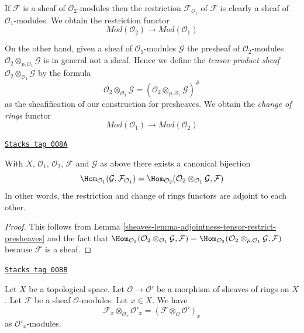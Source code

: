 \medskip\noindent
If $\mathcal{F}$ is a sheaf of $\mathcal{O}_2$-modules
then the restriction $\mathcal{F}_{\mathcal{O}_1}$
of $\mathcal{F}$ is clearly a sheaf
of $\mathcal{O}_1$-modules. We obtain the restriction functor
$$
\textit{Mod}(\mathcal{O}_2)
\longrightarrow
\textit{Mod}(\mathcal{O}_1)
$$

\medskip\noindent
On the other hand, given a sheaf of $\mathcal{O}_1$-modules
$\mathcal{G}$ the presheaf of $\mathcal{O}_2$-modules
$\mathcal{O}_2 \otimes_{p, \mathcal{O}_1} \mathcal{G}$
is in general not a sheaf. Hence we define the
{\it tensor product sheaf}
$\mathcal{O}_2 \otimes_{\mathcal{O}_1} \mathcal{G}$
by the formula
$$
\mathcal{O}_2 \otimes_{\mathcal{O}_1} \mathcal{G}
=
(\mathcal{O}_2 \otimes_{p, \mathcal{O}_1} \mathcal{G})^\#
$$
as the sheafification of our construction for presheaves.
We obtain the {\it change of rings} functor
$$
\textit{Mod}(\mathcal{O}_1)
\longrightarrow
\textit{Mod}(\mathcal{O}_2)
$$

\begin{lemma}
\label{sheaves-lemma-adjointness-tensor-restrict}
\href{https://stacks.math.columbia.edu/tag/008A}{\texttt{Stacks tag 008A}}

With $X$, $\mathcal{O}_1$, $\mathcal{O}_2$, $\mathcal{F}$ and
$\mathcal{G}$ as above there exists a canonical bijection
$$
\Hom_{\mathcal{O}_1}(\mathcal{G}, \mathcal{F}_{\mathcal{O}_1})
=
\Hom_{\mathcal{O}_2}(
\mathcal{O}_2 \otimes_{\mathcal{O}_1} \mathcal{G},
\mathcal{F}
)
$$
In other words, the restriction and change of rings functors
are adjoint to each other.
\end{lemma}

\begin{proof}

This follows from
Lemma \ref{sheaves-lemma-adjointness-tensor-restrict-presheaves}
and the fact that
$\Hom_{\mathcal{O}_2}(
\mathcal{O}_2 \otimes_{\mathcal{O}_1} \mathcal{G},
\mathcal{F}
)
=
\Hom_{\mathcal{O}_2}(
\mathcal{O}_2 \otimes_{p, \mathcal{O}_1} \mathcal{G},
\mathcal{F}
)$
because $\mathcal{F}$ is a sheaf.
\end{proof}

\begin{lemma}
\label{sheaves-lemma-stalk-tensor-sheaf-modules}
\href{https://stacks.math.columbia.edu/tag/008B}{\texttt{Stacks tag 008B}}

Let $X$ be a topological space.
Let $\mathcal{O} \to \mathcal{O}'$ be a morphism of
sheaves of rings on $X$.
Let $\mathcal{F}$ be a sheaf $\mathcal{O}$-modules.
Let $x \in X$. We have
$$
\mathcal{F}_x \otimes_{\mathcal{O}_x} \mathcal{O}'_x
=
(\mathcal{F} \otimes_\mathcal{O} \mathcal{O}')_x
$$
as $\mathcal{O}'_x$-modules.
\end{lemma}

